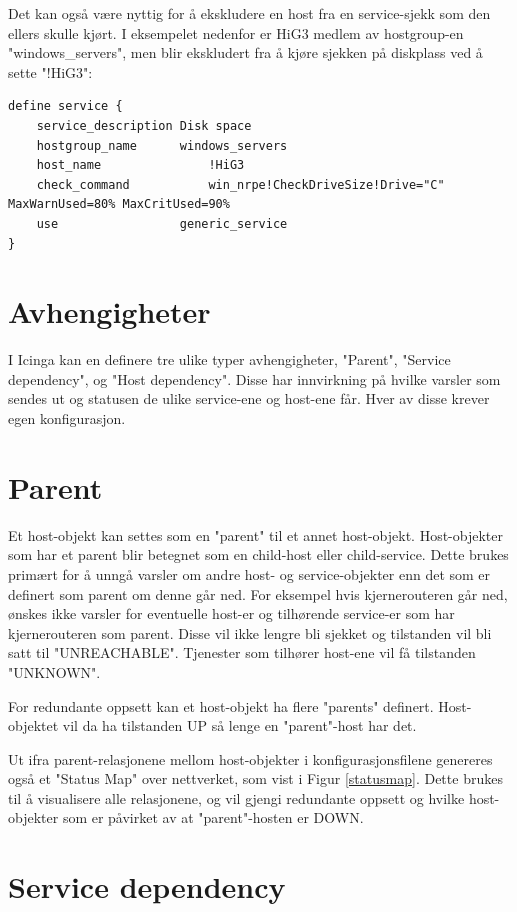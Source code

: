 Det kan også være nyttig for å ekskludere en host fra en service-sjekk som den ellers skulle kjørt. I eksempelet nedenfor er HiG3 medlem av hostgroup-en "windows\_servers", men blir ekskludert fra å kjøre sjekken på diskplass ved å sette "!HiG3":

\begin{lstlisting}[style=example]
define service {
	service_description	Disk space
	hostgroup_name		windows_servers
	host_name               !HiG3
	check_command        	win_nrpe!CheckDriveSize!Drive="C" MaxWarnUsed=80% MaxCritUsed=90%
	use                	generic_service
}
\end{lstlisting}

\section{Avhengigheter}

I Icinga kan en definere tre ulike typer avhengigheter, "Parent", "Service dependency", og "Host dependency". Disse har innvirkning på hvilke varsler som sendes ut og statusen de ulike service-ene og host-ene får. Hver av disse krever egen konfigurasjon. 

\section{Parent}\label{sec:parent}
Et host-objekt kan settes som en "parent" til et annet host-objekt. Host-objekter som har et parent blir betegnet som en child-host eller child-service. Dette brukes primært for å unngå varsler om andre host- og service-objekter enn det som er definert som parent om denne går ned. For eksempel hvis kjernerouteren går ned, ønskes ikke varsler for eventuelle host-er og tilhørende service-er som har kjernerouteren som parent. Disse vil ikke lengre bli sjekket og tilstanden vil bli satt til "UNREACHABLE". Tjenester som tilhører host-ene vil få tilstanden "UNKNOWN".

For redundante oppsett kan et host-objekt ha flere "parents" definert. Host-objektet vil da ha tilstanden UP så lenge en "parent"-host har det.

Ut ifra parent-relasjonene mellom host-objekter i konfigurasjonsfilene genereres også et "Status Map" over nettverket, som vist i Figur \ref{statusmap}. Dette brukes til å visualisere alle relasjonene, og vil gjengi redundante oppsett og hvilke host-objekter som er påvirket av at "parent"-hosten er DOWN.

\section{Service dependency}\label{sec:servicedependency}


